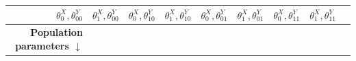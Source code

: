\documentclass[
  12pt,
]{book}
\begin{document}
\begin{longtable}[]{@{}rcccccccc@{}}
\begin{minipage}[b]{0.08\columnwidth}
\(\theta^X_0,\theta^Y_{00}\)\strut
\end{minipage} & \begin{minipage}[b]{0.08\columnwidth}\centering
\(\theta^X_1,\theta^Y_{00}\)\strut
\end{minipage} & \begin{minipage}[b]{0.08\columnwidth}\centering
\(\theta^X_0,\theta^Y_{10}\)\strut
\end{minipage} & \begin{minipage}[b]{0.08\columnwidth}\centering
\(\theta^X_1,\theta^Y_{10}\)\strut
\end{minipage} & \begin{minipage}[b]{0.08\columnwidth}\centering
\(\theta^X_0,\theta^Y_{01}\)\strut
\end{minipage} & \begin{minipage}[b]{0.08\columnwidth}\centering
\(\theta^X_1,\theta^Y_{01}\)\strut
\end{minipage} & \begin{minipage}[b]{0.08\columnwidth}\centering
\(\theta^X_0,\theta^Y_{11}\)\strut
\end{minipage} & \begin{minipage}[b]{0.08\columnwidth}\centering
\(\theta^X_1,\theta^Y_{11}\)\strut
\end{minipage}\tabularnewline
\midrule
\endhead
\begin{minipage}[t]{0.12\columnwidth}\raggedleft
\textbf{Population parameters \(\downarrow\)}\strut
\end{minipage} & \begin{minipage}[t]{0.08\columnwidth}\centering
\strut
\end{minipage} & \begin{minipage}[t]{0.08\columnwidth}\centering
\strut
\end{minipage} & \begin{minipage}[t]{0.08\columnwidth}\centering
\strut
\end{minipage} & \begin{minipage}[t]{0.08\columnwidth}\centering
\strut
\end{minipage} & \begin{minipage}[t]{0.08\columnwidth}\centering
\strut
\end{minipage} & \begin{minipage}[t]{0.08\columnwidth}\centering
\strut
\end{minipage} & \begin{minipage}[t]{0.08\columnwidth}\centering
\strut
\end{minipage} & \begin{minipage}[t]{0.08\columnwidth}\centering

\end{minipage}
\end{longtable}
\end{document}
